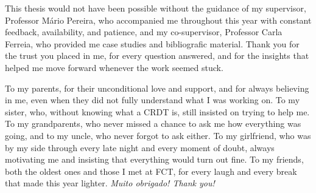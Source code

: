 
%

\begin{ntacknowledgements}

This thesis would not have been possible without the guidance of my supervisor, Professor Mário Pereira, who accompanied
me throughout this year with constant feedback, availability, and patience, and my co-supervisor, Professor Carla Ferreia,
who provided me case studies and bibliografic material. Thank you for the trust you placed in me, for
every question answered, and for the insights that helped me move forward whenever the work seemed stuck.

To my parents, for their unconditional love and support, and for always believing in me, even when they did not fully
understand what I was working on. To my sister, who, without knowing what a CRDT is, still insisted on trying to help me.
To my grandparents, who never missed a chance to ask me how everything was going, and to my uncle, who never forgot to ask
either. To my girlfriend, who was by my side through every late night and every moment of doubt, always motivating me and
insisting that everything would turn out fine. To my friends, both the oldest ones and those I met at FCT, for every laugh
and every break that made this year lighter. \emph{Muito obrigado! Thank you!}

\end{ntacknowledgements}